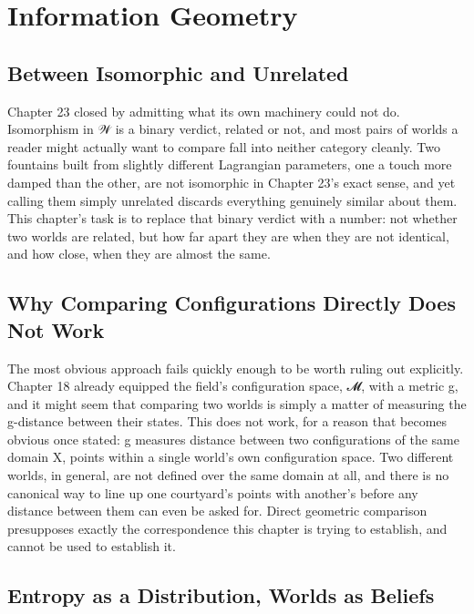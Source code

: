\chapter{Information Geometry}

\section{Between Isomorphic and Unrelated}

Chapter 23 closed by admitting what its own machinery could not do. Isomorphism in 𝒲 is a binary verdict, related or not, and most pairs of worlds a reader might actually want to compare fall into neither category cleanly. Two fountains built from slightly different Lagrangian parameters, one a touch more damped than the other, are not isomorphic in Chapter 23's exact sense, and yet calling them simply unrelated discards everything genuinely similar about them. This chapter's task is to replace that binary verdict with a number: not whether two worlds are related, but how far apart they are when they are not identical, and how close, when they are almost the same.

\section{Why Comparing Configurations Directly Does Not Work}

The most obvious approach fails quickly enough to be worth ruling out explicitly. Chapter 18 already equipped the field's configuration space, 𝓜, with a metric g, and it might seem that comparing two worlds is simply a matter of measuring the g-distance between their states. This does not work, for a reason that becomes obvious once stated: g measures distance between two configurations of the same domain X, points within a single world's own configuration space. Two different worlds, in general, are not defined over the same domain at all, and there is no canonical way to line up one courtyard's points with another's before any distance between them can even be asked for. Direct geometric comparison presupposes exactly the correspondence this chapter is trying to establish, and cannot be used to establish it.

\section{Entropy as a Distribution, Worlds as Beliefs}

